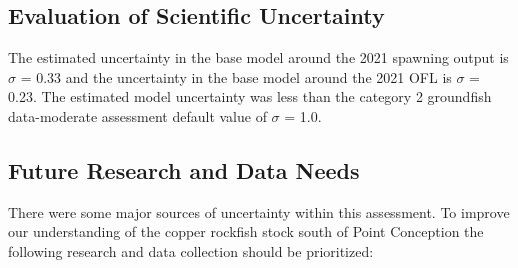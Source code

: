 \documentclass[11pt,
  english,
  a4paper,
]{article}
\begin{document}

\hypertarget{evaluation-of-scientific-uncertainty}{%
\subsection{Evaluation of Scientific Uncertainty}\label{evaluation-of-scientific-uncertainty}}

\leavevmode\tagmcend\tagstructend


The estimated uncertainty in the base model around the 2021 spawning output is {\(\sigma\)\leavevmode\tagmcend\tagstructend} = 0.33 and the uncertainty in the base model around the 2021 OFL is {\(\sigma\)\leavevmode\tagmcend\tagstructend} = 0.23. The estimated model uncertainty was less than the category 2 groundfish data-moderate assessment default value of {\(\sigma\)\leavevmode\tagmcend\tagstructend} = 1.0.

\leavevmode\tagmcend\tagstructend\par


\hypertarget{future-research-and-data-needs}{%
\subsection{Future Research and Data Needs}\label{future-research-and-data-needs}}

\leavevmode\tagmcend\tagstructend


There were some major sources of uncertainty within this assessment. To improve our understanding of the copper rockfish stock south of Point Conception the following research and data collection should be prioritized:

\leavevmode\tagmcend\tagstructend\par
\end{document}
